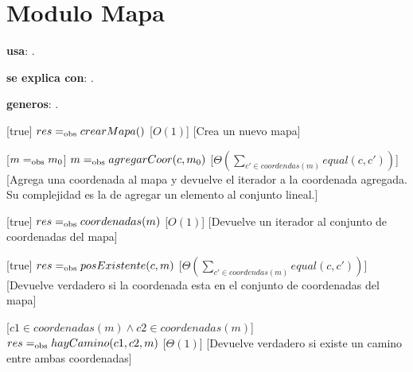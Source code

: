 \section{Modulo Mapa}


\begin{Interfaz}

  \textbf{usa}: .

  \textbf{se explica con}: .

  \textbf{generos}: .

  [true]
  {$res =_{\mathrm{obs}} crearMapa()$}
  [$O(1)$]
  [Crea un nuevo mapa]

  [$m =_{\mathrm{obs}} m_0$]
  {$m =_{\mathrm{obs}} agregarCoor(c, m_0)$}
  [$\Theta\left(\displaystyle\sum_{c' \in coordendas(m)}equal(c,c')\right)$]
  [Agrega una coordenada al mapa y devuelve el iterador a la coordenada agregada. Su complejidad es la de agregar un elemento al conjunto lineal.]

  [true]
  {$res =_{\mathrm{obs}} coordenadas(m)$}
  [$O(1)$]
  [Devuelve un iterador al conjunto de coordenadas del mapa]
  
  [true]
  {$res =_{\mathrm{obs}} posExistente(c, m)$}
  [$\Theta\left(\displaystyle\sum_{c' \in coordendas(m)}equal(c,c')\right)$]
  [Devuelve verdadero si la coordenada esta en el conjunto de coordenadas del mapa]
  
  [$c1 \in coordenadas(m) \land c2 \in coordenadas(m)$]
  {$res =_{\mathrm{obs}} hayCamino(c1, c2, m)$}
  [$\Theta(1)$]
  [Devuelve verdadero si existe un camino entre ambas coordenadas]
    
\end{Interfaz}

